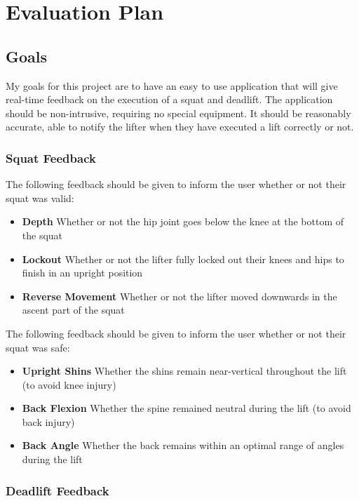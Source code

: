 \section{Evaluation Plan}

\subsection{Goals}

My goals for this project are to have an easy to use application that will give real-time feedback on the execution of a squat and deadlift. The application should be non-intrusive, requiring no special equipment. It should be reasonably accurate, able to notify the lifter when they have executed a lift correctly or not.

\subsubsection{Squat Feedback}

The following feedback should be given to inform the user whether or not their squat was valid:

\begin{itemize}
	\item \textbf{Depth} Whether or not the hip joint goes below the knee at the bottom of the squat
	\item \textbf{Lockout} Whether or not the lifter fully locked out their knees and hips to finish in an upright position
	\item \textbf{Reverse Movement} Whether or not the lifter moved downwards in the ascent part of the squat
\end{itemize}

The following feedback should be given to inform the user whether or not their squat was safe:

\begin{itemize}
	\item \textbf{Upright Shins} Whether the shins remain near-vertical throughout the lift (to avoid knee injury)
	\item \textbf{Back Flexion} Whether the spine remained neutral during the lift (to avoid back injury)
	\item \textbf{Back Angle} Whether the back remains within an optimal range of angles during the lift
\end{itemize}

\subsubsection{Deadlift Feedback}


